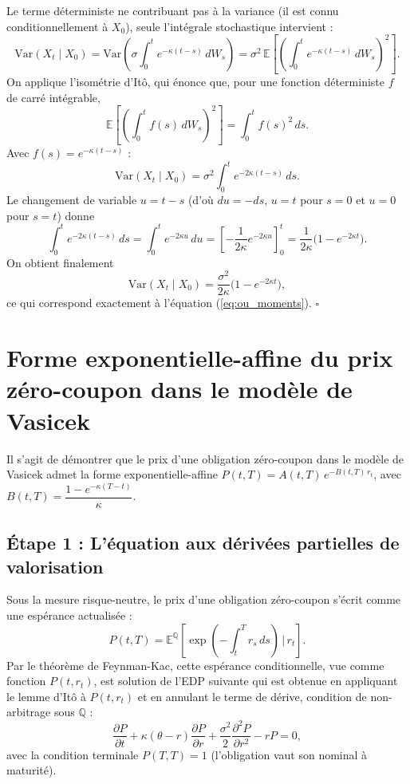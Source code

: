Le terme déterministe ne contribuant pas à la variance (il est connu conditionnellement à $X_0$), seule l'intégrale stochastique intervient :
\[
    \mathrm{Var}(X_t \mid X_0)
    = \mathrm{Var}\!\left(\sigma\int_0^t e^{-\kappa(t-s)}\,dW_s\right)
    = \sigma^2\,\mathbb{E}\!\left[\left(\int_0^t e^{-\kappa(t-s)}\,dW_s\right)^{\!2}\right].
\]
On applique l'isométrie d'Itô, qui énonce que, pour une fonction déterministe $f$ de carré intégrable,
\[
    \mathbb{E}\!\left[\left(\int_0^t f(s)\,dW_s\right)^{\!2}\right] = \int_0^t f(s)^2\,ds.
\]
Avec $f(s) = e^{-\kappa(t-s)}$ :
\[
    \mathrm{Var}(X_t \mid X_0) = \sigma^2 \int_0^t e^{-2\kappa(t-s)}\,ds.
\]
Le changement de variable $u = t-s$ (d'où $du = -ds$, $u = t$ pour $s = 0$ et $u = 0$ pour $s = t$) donne
\[
    \int_0^t e^{-2\kappa(t-s)}\,ds = \int_0^t e^{-2\kappa u}\,du
    = \left[-\frac{1}{2\kappa}e^{-2\kappa u}\right]_0^t = \frac{1}{2\kappa}\bigl(1 - e^{-2\kappa t}\bigr).
\]
On obtient finalement
\[
    \mathrm{Var}(X_t \mid X_0) = \frac{\sigma^2}{2\kappa}\bigl(1 - e^{-2\kappa t}\bigr),
\]
ce qui correspond exactement à l'équation (\ref{eq:ou_moments}). \hfill$\square$

\section{Forme exponentielle-affine du prix zéro-coupon dans le modèle de Vasicek}
\label{ann:vasicek_zc}

Il s'agit de démontrer que le prix d'une obligation zéro-coupon dans le modèle de Vasicek admet la forme exponentielle-affine $P(t,T) = A(t,T)\,e^{-B(t,T)\,r_t}$, avec $B(t,T) = \dfrac{1-e^{-\kappa(T-t)}}{\kappa}$.

\subsection*{Étape 1 : L'équation aux dérivées partielles de valorisation}

Sous la mesure risque-neutre, le prix d'une obligation zéro-coupon s'écrit comme une espérance actualisée :
\[
    P(t,T) = \mathbb{E}^{\mathbb{Q}}\!\left[\exp\!\left(-\int_t^T r_s\,ds\right) \,\Big|\, r_t\right].
\]
Par le théorème de Feynman-Kac, cette espérance conditionnelle, vue comme fonction $P(t,r_t)$, est solution de l'EDP suivante qui est obtenue en appliquant le lemme d'Itô à $P(t,r_t)$ et en annulant le terme de dérive, condition de non-arbitrage sous $\mathbb{Q}$ :
\[
    \frac{\partial P}{\partial t} + \kappa(\theta - r)\frac{\partial P}{\partial r} + \frac{\sigma^2}{2}\frac{\partial^2 P}{\partial r^2} - rP = 0,
\]
avec la condition terminale $P(T,T) = 1$ (l'obligation vaut son nominal à maturité).

